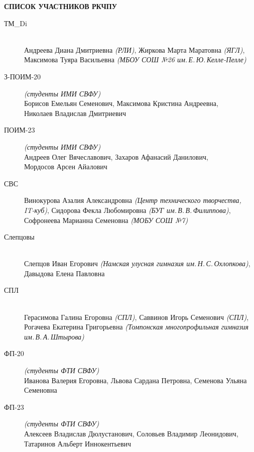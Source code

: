 \newpage
\noindent
\textbf{СПИСОК УЧАСТНИКОВ РКЧПУ}
\begin{description}

\item[ТМ\_Di] ~ \\
Андреева Диана Дмитриевна \textit{(РЛИ)},
Жиркова Марта Маратовна \textit{(ЯГЛ)},
Максимова Туяра Васильевна \textit{(МБОУ СОШ №26 им.\,Е.\,Ю.\,Келле-Пелле)}

\item[З-ПОИМ-20] \textit{(студенты ИМИ СВФУ)} \\
Борисов Емельян Семенович, Максимова Кристина Андреевна, \\
Николаев Владислав Дмитриевич

\item[ПОИМ-23] \textit{(студенты ИМИ СВФУ)} \\
Андреев Олег Вячеславович, Захаров Афанасий Данилович, \\
Мордосов Арсен Айалович

\item[СВС]
Винокурова Азалия Александровна \textit{(Центр технического творчества, \\ IT-куб)},
Сидорова Фекла Любомировна \textit{(БУГ им.\,В.\,В.\,Филиппова)}, \\
Софронеева Марианна Семеновна \textit{(МОБУ СОШ №7)}

\item[Слепцовы] ~ \\
Слепцов Иван Егорович \textit{(Намская улусная гимназия им.\,Н.\,С.\,Охлопкова)}, \\
Давыдова Елена Павловна

\item[СПЛ] ~ \\
Герасимова Галина Егоровна \textit{(СПЛ)},
Саввинов Игорь Семенович \textit{(СПЛ)}, \\
Рогачева Екатерина Григорьевна \textit{(Томпонская многопрофильная гимназия им.\,В.\,А.\,Штырова)}

\item[ФП-20] \textit{(студенты ФТИ СВФУ)} \\
Иванова Валерия Егоровна, Львова Сардана Петровна, Семенова Ульяна Семеновна

\item[ФП-23] \textit{(студенты ФТИ СВФУ)} \\
Алексеев Владислав Дюлустанович, Соловьев Владимир Леонидович, Татаринов Альберт Иннокентьевич


\end{description}
